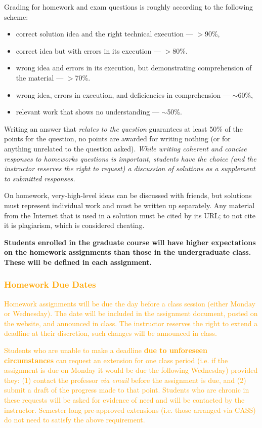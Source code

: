 \documentclass[12pt]{scrartcl}
\newcommand{\add}[1]{\textcolor{orange}{#1}}
\begin{document}
Grading for homework and exam questions is roughly according to the following scheme:
\begin{itemize}
\item correct solution idea and the right technical execution --- $>$90\%, 
\item correct idea but with errors in its execution --- $>$80\%. 
\item wrong idea and errors in its execution, but demonstrating comprehension of the material --- $>$70\%. 
\item wrong idea, errors in execution, and deficiencies in comprehension --- $\sim$60\%, 
\item relevant work that shows no understanding --- $\sim$50\%.
\end{itemize}
Writing an answer that \emph{relates to the question} guarantees at least 50\% of the points for the question, 
no points are awarded for writing nothing (or for anything unrelated to the question asked).
\emph{While writing coherent and concise responses to homeworks questions is important, 
students have the choice (and the instructor reserves the right to request) a discussion of solutions as a supplement to submitted responses. }

On homework, very-high-level ideas can be discussed with friends, but solutions must represent individual work and must be written up separately. 
Any material from the Internet that is used in a solution must be cited by its URL; to not cite it is plagiarism, which is considered cheating.

\textbf{Students enrolled in the graduate course will have higher expectations on the homework assignments than those in the undergraduate class. 
These will be defined in each assignment. }

\subsubsection{\add{Homework Due Dates}}

\add{
Homework assignments will be due the day before a class session (either Monday or Wednesday).
The date will be included in the assignment document, posted on the website, and announced in class. 
The instructor reserves the right to extend a deadline at their discretion, such changes will be announced in class.}

\add{Students who are unable to make a deadline \textbf{due to unforeseen circumstances} can request an extension for one class period 
(i.e. if the assignment is due on Monday it would be due the following Wednesday) provided they: (1) contact the professor \emph{via email}
before the assignment is due, and (2) submit a draft of the progress made to that point. 
Students who are chronic in these requests will be asked for evidence of need and will be contacted by the instructor. 
Semester long pre-approved extensions (i.e. those arranged via CASS) do not need to satisfy the above requirement. 
} 
\end{document}
